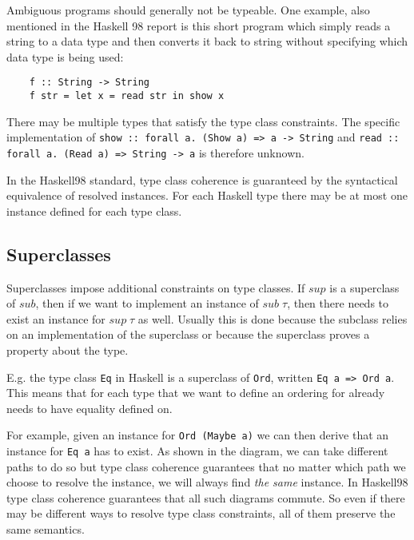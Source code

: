 Ambiguous programs should generally not be typeable.
One example, also mentioned in the Haskell 98 report \cite{Haskell98} is this short program which simply reads a string to a data type and then converts it back to string without specifying which data type is being used:

\begin{verbatim}
    f :: String -> String
    f str = let x = read str in show x
\end{verbatim}

There may be multiple types that satisfy the type class constraints.
The specific implementation of \texttt{show :: forall a. (Show a) => a -> String} and \texttt{read :: forall a. (Read a) => String -> a} is therefore unknown.

In the Haskell98 standard, type class coherence is guaranteed by the syntactical equivalence of resolved instances.
For each Haskell type there may be at most one instance defined for each type class.


\subsection{Superclasses}

Superclasses impose additional constraints on type classes.
If $sup$ is a superclass of $sub$, then if we want to implement an instance of $sub \;\tau$, then there needs to exist an instance for $sup \;\tau$ as well.
Usually this is done because the subclass relies on an implementation of the superclass or because the superclass proves a property about the type.

E.g. the type class \texttt{Eq} in Haskell is a superclass of \texttt{Ord}, written \texttt{Eq a => Ord a}.
This means that for each type that we want to define an ordering for already needs to have equality defined on.

For example, given an instance for \texttt{Ord (Maybe a)} we can then derive that an instance for \texttt{Eq a} has to exist.
As shown in the diagram, we can take different paths to do so but type class coherence guarantees that no matter which path we choose to resolve the instance, we will always find \emph{the same} instance.
In Haskell98 type class coherence guarantees that all such diagrams commute.
So even if there may be different ways to resolve type class constraints, all of them preserve the same semantics.

